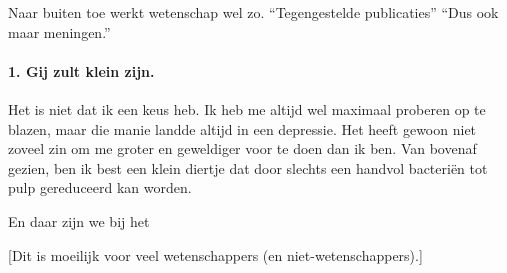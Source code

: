 \documentclass[12pt,a4paper]{article}
\begin{document}
Naar buiten toe werkt wetenschap wel zo. “Tegengestelde publicaties” “Dus ook maar meningen.”


\paragraph{1. Gij zult klein zijn.} Het is niet dat ik een keus heb. Ik heb me altijd wel maximaal proberen op te blazen, maar die manie landde altijd in een depressie. Het heeft gewoon niet zoveel zin om me groter en geweldiger voor te doen dan ik ben. Van bovenaf gezien, ben ik best een klein diertje dat door slechts een handvol bacteriën tot pulp gereduceerd kan worden.

En daar zijn we bij het 

[Dit is moeilijk voor veel wetenschappers (en niet-wetenschappers).]
\end{document}
